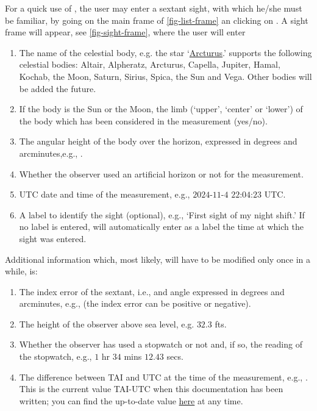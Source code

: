 \documentclass{ol-softwaremanual}
\begin{document}
For a quick use of \thel, the user may enter a sextant \gls{sight}, with which he/she must be familiar, by going on the main frame of \cref{fig-list-frame} an clicking on . A \gls{sight} frame will appear, see \cref{fig-sight-frame}, where the user will enter
\begin{enumerate}
  \item \label{item-name} The name of the celestial \gls{body}, e.g. the star `\href{https://fr.wikipedia.org/wiki/Arcturus}{Arcturus}.' \thel supports the following celestial bodies: Altair, Alpheratz, Arcturus, Capella, Jupiter, Hamal, Kochab, the Moon, Saturn, Sirius, Spica, the Sun and Vega. Other bodies will be added the future. 
  \item \label{item-limb}  If the \gls{body} is the Sun or the Moon, the  limb (`upper', `center' or `lower') of the \gls{body} which has been considered in the measurement (yes/no).
  \item \label{item-body-height} The angular height of the  \gls{body} over the horizon, expressed in degrees and arcminutes,e.g., .
  \item \label{item-artificial-horizon} Whether the observer used an artificial horizon or not for the measurement.
  \item \label{item-time} \ac{UTC} date and time of the measurement, e.g., $2024$-$11$-$4$ $22$:$04$:$23$ \ac{UTC}.
  \item \label{item-label} A label to identify the \gls{sight} (optional), e.g., `First \gls{sight} of my night shift.' If no label is entered, \thel will automatically enter as a label the time at which the \gls{sight} was entered. 
  \end{enumerate}
  
  Additional information which, most likely, will have to be modified only once in a while, is: 
  \begin{enumerate}[resume]
    \item \label{item-index-error} The index error \cite{bowditch2002the} of the sextant,  i.e., and angle expressed in degrees and arcminutes, e.g.,  (the index error can be positive or negative).
    \item \label{item-observer-height} The height of the observer above sea level, e.g. $32.3$ \acp{ft}.
    \item \label{item-stopwatch} Whether the observer has used a stopwatch or not and, if so, the reading of the stopwatch, e.g., $1$ \ac{hr}  $34$ \acp{min} $12.43$ \acp{sec}.
    \item \label{item-tai-utc} The difference between \ac{TAI} and \ac{UTC} at the time of the measurement, e.g., .  This is the current value  \ac{TAI}-\ac{UTC} when this documentation has been written; you can find the up-to-date value  \href{https://en.wikipedia.org/wiki/Leap_second}{here} at any time. 
  \end{enumerate}
\end{document}
